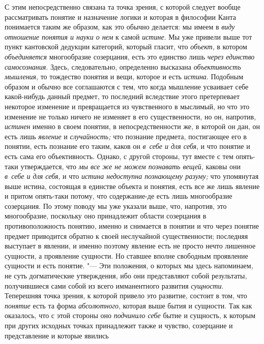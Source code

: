 С этим непосредственно связана та точка зрения, с которой
следует вообще рассматривать понятие и назначение логики и которая в
философии Канта понимается таким же образом, как это обычно делается: мы
имеем в {\em виду отношение понятия и науки о нем} к самой {\em истине}. Мы уже
привели выше тот пункт кантовской дедукции категорий, который гласит, что
{\em объект}, в котором {\em объединяется}
многообразие созерцания, есть это единство лишь
{\em через единство самосознания}. Здесь, следовательно, определенно высказана
{\em объективность мышления}, то тождество понятия и вещи, которое и есть
{\em истина}. Подобным
образом и обычно все соглашаются с тем, что когда мышление усваивает себе
какой-нибудь данный предмет, то последний вследствие этого претерпевает
некоторое изменение и превращается из чувственного в мыслимый, но что это
изменение не только ничего не изменяет в его существенности, но он,
напротив, {\em истинен}
именно в своем понятии, в непосредственности же, в которой он
дан, он есть лишь {\em явление} и {\em случайность;}
что познание предмета, постигающее его в понятии, есть
познание его таким, каков он {\em в~себе
и для себя}, и что понятие и есть сама его объективность.
Однако, с другой стороны, тут вместе с тем опять-таки
утверждается,
что {\em мы все же не можем познавать вещей}, каковы они
{\em в~себе и для себя}, и что {\em истина
недоступна познающему разуму;} что упомянутая выше
истина, состоящая в единстве объекта и понятия, есть все же
лишь явление и притом опять-таки потому, что содержание-де есть лишь
многообразие созерцания. По этому поводу мы уже указали выше, что,
напротив, это многообразие, поскольку оно принадлежит области созерцания в
противоположность понятию, именно и снимается в понятии и что через понятие
предмет приводится обратно к своей неслучайной существенности; последняя
выступает в явлении, и именно поэтому явление есть не просто нечто лишенное
сущности, а проявление сущности. Но ставшее вполне свободным проявление
сущности и есть понятие. "--- Эти положения, о которых мы здесь
напоминаем, не суть догматические утверждения, ибо они представляют собой
результаты, получившиеся сами собой из всего имманентного развития
{\em сущности}. Теперешняя точка зрения, к которой привело это развитие,
состоит в том, что {\em понятие} есть та форма {\em абсолютного},
которая выше бытия и сущности. Так как оказалось, что с этой
стороны оно {\em подчинило себе}
бытие и сущность, к которым при других исходных точках
принадлежит также и чувство, созерцание и представление и которые явились
